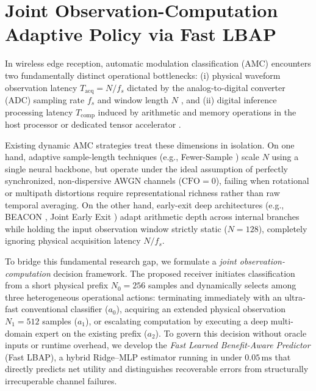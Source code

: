 
\section{Joint Observation-Computation Adaptive Policy via Fast LBAP}
\label{sec:adaptive_policy}

In wireless edge reception, automatic modulation classification (AMC) encounters two fundamentally distinct operational bottlenecks: (i) physical waveform observation latency $T_{\mathrm{acq}} = N / f_s$ dictated by the analog-to-digital converter (ADC) sampling rate $f_s$ and window length $N$ \cite{guo2025fewer}, and (ii) digital inference processing latency $T_{\mathrm{comp}}$ induced by arithmetic and memory operations in the host processor or dedicated tensor accelerator \cite{liu2026beacon, denboer2021fpga}. 

Existing dynamic AMC strategies treat these dimensions in isolation. On one hand, adaptive sample-length techniques (e.g., Fewer-Sample \cite{guo2025fewer}) scale $N$ using a single neural backbone, but operate under the ideal assumption of perfectly synchronized, non-dispersive AWGN channels ($\mathrm{CFO} = 0$), failing when rotational or multipath distortions require representational richness rather than raw temporal averaging. On the other hand, early-exit deep architectures (e.g., BEACON \cite{liu2026beacon}, Joint Early Exit \cite{liu2025joint}) adapt arithmetic depth across internal branches while holding the input observation window strictly static ($N = 128$), completely ignoring physical acquisition latency $N / f_s$.

To bridge this fundamental research gap, we formulate a \emph{joint observation-computation} decision framework. The proposed receiver initiates classification from a short physical prefix $N_0 = 256$ samples and dynamically selects among three heterogeneous operational actions: terminating immediately with an ultra-fast conventional classifier ($a_0$), acquiring an extended physical observation $N_1 = 512$ samples ($a_1$), or escalating computation by executing a deep multi-domain expert on the existing prefix ($a_2$). To govern this decision without oracle inputs or runtime overhead, we develop the \emph{Fast Learned Benefit-Aware Predictor} (Fast LBAP), a hybrid Ridge--MLP estimator running in under $0.05\,\mathrm{ms}$ that directly predicts net utility and distinguishes recoverable errors from structurally irrecuperable channel failures.

